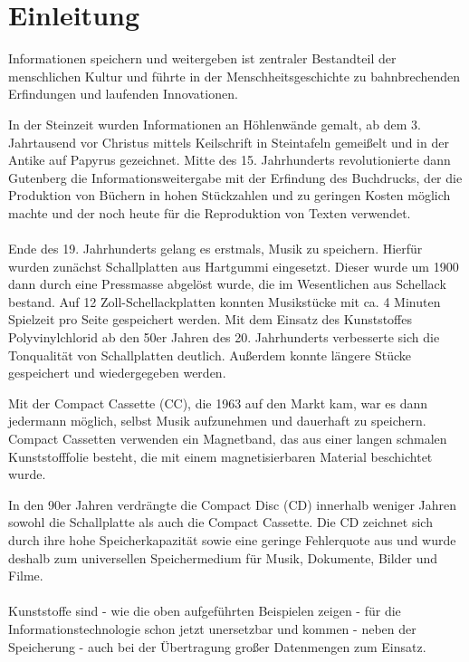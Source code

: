 \section{Einleitung}


Informationen speichern und weitergeben ist zentraler Bestandteil der menschlichen Kultur und führte 
in der Menschheitsgeschichte zu bahnbrechenden Erfindungen und laufenden Innovationen.

In der Steinzeit wurden Informationen an Höhlenwände gemalt, ab dem 3. Jahrtausend vor Christus
mittels Keilschrift in Steintafeln gemeißelt und in der Antike auf Papyrus gezeichnet. Mitte
des 15. Jahrhunderts revolutionierte dann Gutenberg die Informationsweitergabe mit der Erfindung des
Buchdrucks, der die Produktion von Büchern in hohen Stückzahlen und zu geringen Kosten möglich
machte und der noch heute für die Reproduktion von Texten verwendet.

\paragraph{}
Ende des 19. Jahrhunderts gelang es erstmals, Musik zu speichern. Hierfür wurden zunächst
Schallplatten aus Hartgummi eingesetzt. Dieser wurde um 1900 dann durch eine Pressmasse abgelöst
wurde, die im Wesentlichen aus Schellack bestand. Auf 12 Zoll-Schellackplatten konnten Musikstücke
mit ca. 4 Minuten Spielzeit pro Seite gespeichert werden. Mit dem Einsatz des Kunststoffes
Polyvinylchlorid ab den 50er Jahren des 20. Jahrhunderts verbesserte sich die Tonqualität von
Schallplatten deutlich. Außerdem konnte längere Stücke gespeichert und wiedergegeben werden.
\cite{schallplatte1}

Mit der Compact Cassette (CC), die 1963 auf den Markt kam, war es dann jedermann möglich, selbst
Musik aufzunehmen und dauerhaft zu speichern. Compact Cassetten verwenden ein Magnetband, das aus
einer langen schmalen Kunststofffolie besteht, die mit einem magnetisierbaren Material beschichtet
wurde. \cite{kassette1} \cite{kassette2}

In den 90er Jahren verdrängte  die Compact Disc (CD) innerhalb weniger Jahren sowohl die
Schallplatte als auch die Compact Cassette. Die CD zeichnet sich durch ihre hohe Speicherkapazität
sowie eine geringe Fehlerquote aus und wurde deshalb zum universellen Speichermedium für Musik, Dokumente,
Bilder und Filme. \cite{cd_durchbruch}

\paragraph{}
Kunststoffe sind - wie die oben aufgeführten Beispielen zeigen - für die Informationstechnologie
schon jetzt unersetzbar und kommen - neben der Speicherung - auch bei der Übertragung großer
Datenmengen zum Einsatz.

